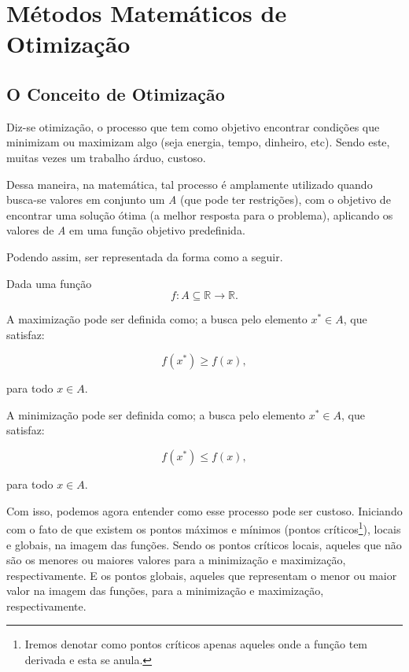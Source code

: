 

\chapter{\Large{Métodos Matemáticos de Otimização}}\label{chp:1}


\section{{O Conceito de Otimização}}

\hspace{0.8cm}
Diz-se otimização, o processo que tem como objetivo encontrar condições que
minimizam ou maximizam algo (seja energia, tempo, dinheiro, etc). Sendo este,
muitas vezes um trabalho árduo, custoso.

Dessa maneira, na matemática, tal processo é amplamente utilizado quando
busca-se valores em conjunto um \textit{A} (que pode ter restrições), com o
objetivo de encontrar uma solução ótima (a melhor resposta para o problema),
aplicando os valores de \textit{A} em uma função objetivo predefinida.

Podendo assim, ser representada da forma como a seguir.

Dada uma função
\begin{equation}
    f : A \subseteq \mathbb{R} \rightarrow \mathbb{R}.
\end{equation}


A maximização pode ser definida como; a busca pelo elemento
\(x^* \in A\), que satisfaz:

\begin{equation}
    f(x^*) \geq f(x),
\end{equation}

para todo \(x \in A\).


A minimização pode ser definida como; a busca pelo elemento \(x^* \in A\),
que satisfaz:

\begin{equation}
    f(x^*) \leq f(x),
\end{equation}

para todo \(x \in A\).

\vspace{\baselineskip}
Com isso, podemos agora entender como esse processo pode ser custoso. Iniciando
com o fato de que existem os pontos máximos e mínimos (pontos
críticos\footnote{Iremos denotar como pontos críticos apenas aqueles onde a função tem derivada e esta se anula.}), locais
e globais, na imagem das funções. Sendo os pontos críticos locais, aqueles que
não são os menores ou maiores valores para a minimização e maximização,
respectivamente. E os pontos globais, aqueles que representam o menor ou maior
valor na imagem das funções, para a minimização e maximização, respectivamente.

